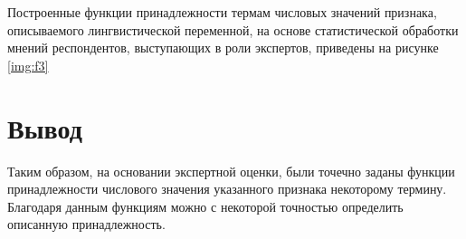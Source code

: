 
Построенные функции принадлежности термам числовых значений признака, описываемого лингвистической переменной, на основе статистической обработки мнений респондентов, выступающих в роли экспертов, приведены на рисунке \ref{img:f3}
 
\newpage
{}

\section*{Вывод}

Таким образом, на основании экспертной оценки, были точечно заданы функции принадлежности числового значения указанного признака некоторому термину. Благодаря данным функциям можно с некоторой точностью определить описанную принадлежность.

